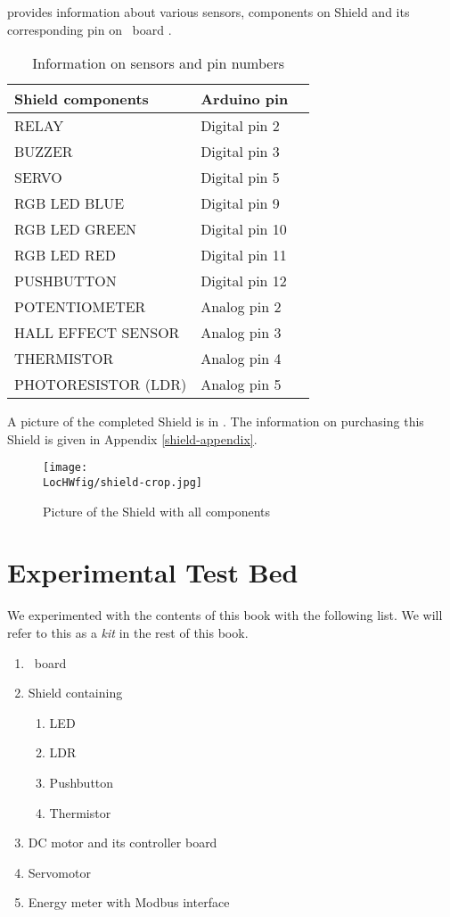  provides information about various sensors,
components on Shield and its corresponding pin on \arduino\ board
\cite{shield-ref}.
\begin{table}
  \centering
  \caption{Information on sensors and pin numbers}
  \label{shield-table}
  \begin{tabular}{llc}
    \hline
    Shield components   & Arduino pin    \\ \hline
    RELAY               & Digital pin 2  \\
    BUZZER              & Digital pin 3  \\
    SERVO               & Digital pin 5  \\
    RGB LED BLUE        & Digital pin 9  \\
    RGB LED GREEN       & Digital pin 10 \\
    RGB LED RED         & Digital pin 11 \\
    PUSHBUTTON          & Digital pin 12 \\
    POTENTIOMETER       & Analog pin 2   \\
    HALL EFFECT SENSOR  & Analog pin 3   \\
    THERMISTOR          & Analog pin 4   \\
    PHOTORESISTOR (LDR) & Analog pin 5   \\

    \hline
  \end{tabular}
\end{table}
A picture of the completed Shield is in . The information on purchasing this Shield is given in Appendix \ref{shield-appendix}.
\begin{figure}
  \centering
  \texttt{[image: \\LocHWfig/shield-crop.jpg]}
  \caption{Picture of the Shield with all components}
  \label{shield}
\end{figure}

\section{Experimental Test Bed}
We experimented with the contents of this book with the
following list.  We will refer to this as a \emph{kit} in the rest of
this book.
\begin{enumerate}
  \item \arduino\ board
  \item Shield containing
        \begin{enumerate}
          \item LED
          \item LDR
          \item Pushbutton
          \item Thermistor
        \end{enumerate}
  \item DC motor and its controller board
  \item Servomotor
  \item Energy meter with Modbus interface
\end{enumerate}

